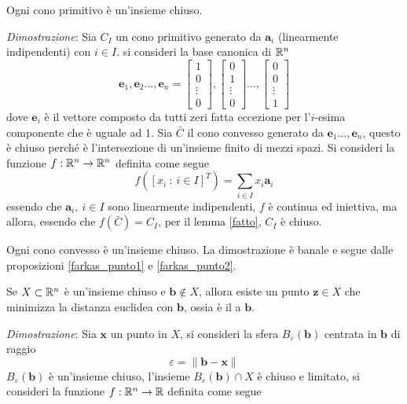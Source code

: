 \documentclass[10pt, letterpaper]{report}
\newcommand{\bb}{{\mathbf{b}}}
\newcommand{\x}{{\mathbf{x}}}
\begin{document}
\begin{proposizione}\label{farkas_punto2}
    Ogni cono primitivo è un'insieme chiuso.
\end{proposizione}
\textit{Dimostrazione}: Sia $C_I$ un cono primitivo generato da $\mathbf{a}_i$ (linearmente indipendenti) con $i\in I$. si consideri la base canonica di ${\mathbb R}^n$
$$ \mathbf e_1,\mathbf e_2\dots,\mathbf e_n=
\begin{bmatrix}
    1\\0\\\vdots\\0
\end{bmatrix},\begin{bmatrix}
    0\\1\\\vdots\\0
\end{bmatrix}\dots,\begin{bmatrix}
    0\\0\\\vdots\\1
\end{bmatrix}$$
dove $\mathbf e_i$ è il vettore composto da tutti zeri fatta eccezione per l'$i$-esima componente che è uguale ad $1$. Sia $\bar C$ il cono convesso generato da $ \mathbf e_1\dots,\mathbf e_n$, questo è chiuso perché è l'intersezione di un'insieme finito di mezzi spazi. Si consideri la funzione $f:{\mathbb R}^n\rightarrow{\mathbb R}^n$ definita come segue 
$$f([x_i \ : \ i\in I]^T)=\sum_{i\in I}x_i\mathbf a_i$$
essendo che $\mathbf{a}_i, \ i\in I$  sono linearmente indipendenti, $f$ è continua ed iniettiva, ma allora, essendo che $f(\bar C)=C_I$, per il lemma \ref{fatto}, $C_I$ è chiuso.
\begin{proposizione}\label{farkas_punto3}
    Ogni cono convesso è un'insieme chiuso. La dimostrazione è banale e segue dalle proposizioni \ref{farkas_punto1} e \ref{farkas_punto2}.
\end{proposizione}
\begin{proposizione}\label{farkas_punto4}
    Se $X\subset {\mathbb R}^n$ è un'insieme chiuso e $\bb\notin X$, allora esiste un punto $\mathbf z\in X$ che minimizza la distanza euclidea con $\bb$, ossia è il  a $\bb$.
\end{proposizione}
\textit{Dimostrazione}: Sia $\x$ un punto in $X$, si consideri la sfera $B_\varepsilon(\bb)$ centrata in $\bb$ di raggio 
$$ \varepsilon = \|\bb-\x\|$$
$B_\varepsilon(\bb)$ è un'insieme chiuso, l'insieme $B_\varepsilon(\bb)\cap X$ è chiuso e limitato, si consideri la funzione $f:{\mathbb R}^n\rightarrow{\mathbb R}$ definita come segue
\end{document}
